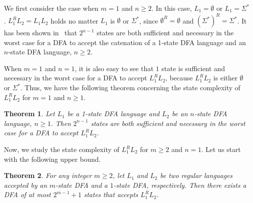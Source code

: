 \documentclass[10pt]{article}
\newtheorem{theorem}{Theorem}
\begin{document}
We first consider the case when $m=1$ and $n\geq 2$. In this case,
$L_1=\emptyset$ or $L_1=\Sigma^*$. $L_1^RL_2=L_1L_2$ holds no matter
$L_1$ is $\emptyset$ or $\Sigma^*$, since $\emptyset ^R=\emptyset$
and $(\Sigma^*)^R=\Sigma^*$. It has been shown in~\cite{YuZhSa94}
that $2^{n-1}$ states are both sufficient and necessary in the worst
case for a DFA to accept the catenation of a 1-state DFA language
and an $n$-state DFA language, $n\ge 2$.

When $m =1$ and $n=1$, it is also easy to see that $1$ state is
sufficient and necessary in the worst case for a DFA to accept
$L_1^RL_2$, because $L_1^RL_2$ is either $\emptyset$ or $\Sigma^*$.
Thus, we have the following theorem concerning the state complexity
of $L_1^RL_2$ for $m=1$ and $n\ge 1$.



\begin{theorem}
\label{L_1^R L_2 state complexity m=1 n>=1} Let $L_1$ be a 1-state
DFA language and $L_2$ be an $n$-state DFA language, $n\ge 1$. Then
$2^{n-1}$ states are both sufficient and necessary in the worst case
for a DFA to accept $L_1^RL_2$.
\end{theorem}

Now, we study the state complexity of $L_1^RL_2$ for $m \ge 2$ and
$n = 1$. Let us start with the following upper bound.

\begin{theorem}
\label{L_1^R L_2 upper bound m>=2 n=1} For any integer $m\ge 2$, let
$L_1$ and $L_2$ be two regular languages accepted by an $m$-state
DFA and a $1$-state DFA, respectively. Then there exists a DFA of at
most $2^{m-1}+1$ states that accepts $L_1^R L_2$.
\end{theorem}
\end{document}
